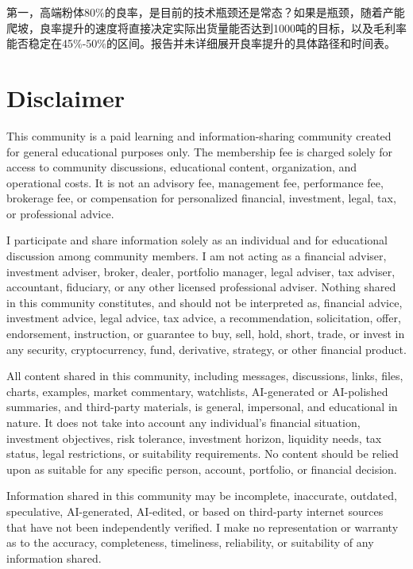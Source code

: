 \documentclass[11pt]{ctexart}
\begin{document}
第一，高端粉体80\%的良率，是目前的技术瓶颈还是常态？如果是瓶颈，随着产能爬坡，良率提升的速度将直接决定实际出货量能否达到1000吨的目标，以及毛利率能否稳定在45\%-50\%的区间。报告并未详细展开良率提升的具体路径和时间表。

\section{Disclaimer}
{\scriptsize\color{refgray}
This community is a paid learning and information-sharing community created for general educational purposes only. The membership fee is charged solely for access to community discussions, educational content, organization, and operational costs. It is not an advisory fee, management fee, performance fee, brokerage fee, or compensation for personalized financial, investment, legal, tax, or professional advice.\par
I participate and share information solely as an individual and for educational discussion among community members. I am not acting as a financial adviser, investment adviser, broker, dealer, portfolio manager, legal adviser, tax adviser, accountant, fiduciary, or any other licensed professional adviser. Nothing shared in this community constitutes, and should not be interpreted as, financial advice, investment advice, legal advice, tax advice, a recommendation, solicitation, offer, endorsement, instruction, or guarantee to buy, sell, hold, short, trade, or invest in any security, cryptocurrency, fund, derivative, strategy, or other financial product.\par
All content shared in this community, including messages, discussions, links, files, charts, examples, market commentary, watchlists, AI-generated or AI-polished summaries, and third-party materials, is general, impersonal, and educational in nature. It does not take into account any individual's financial situation, investment objectives, risk tolerance, investment horizon, liquidity needs, tax status, legal restrictions, or suitability requirements. No content should be relied upon as suitable for any specific person, account, portfolio, or financial decision.\par
Information shared in this community may be incomplete, inaccurate, outdated, speculative, AI-generated, AI-edited, or based on third-party internet sources that have not been independently verified. I make no representation or warranty as to the accuracy, completeness, timeliness, reliability, or suitability of any information shared.\par
}
\end{document}
